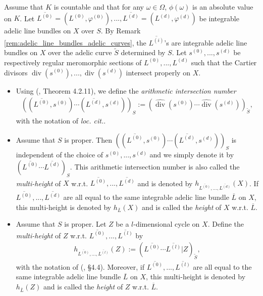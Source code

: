 \documentclass [11pt,reqno]{amsart}
\newcommand{\1}{\mathmybb{1}}
\def\div{\operatorname{div}}
\def\tilde{\widetilde}
\begin{document}
\begin{theorem-definition}
\label{th-def:arithmetic_intersection_product_tac_countable}
Assume that $K$ is countable and that for any $\omega\in\Omega$, $\phi(\omega)$ is an absolute value on $K$. Let $\overline{L^{(0)}}=(L^{(0)},\varphi^{(0)}),...,\overline{L^{(d)}}=(L^{(d)},\varphi^{(d)})$ be integrable adelic line bundles on $X$ over $S$. By Remark \ref{rem:adelic_line_bundles_adelic_curves}, the $\overline{L^{(i)}}$'s are integrable adelic line bundles on $X$ over the adelic curve $\tilde{S}$ determined by $S$. Let $s^{(0)},...,s^{(d)}$ be respectively regular meromorphic sections of $L^{(0)},...,L^{(d)}$ such that the Cartier divisors $\div(s^{(0)}),...,\div(s^{(d)})$ intersect properly on $X$.
\begin{itemize}
	\item[(1)] Using (\cite{ChenMori21}, Theorem 4.2.11), we define the \emph{arithmetic intersection number}
\begin{align*}
\left((\overline{L^{(0)}},s^{(0)})\cdots(\overline{L^{(d)}},s^{(d)})\right)_{S} := (\widehat{\div}(s^{(0)})\cdots\widehat{\div}(s^{(d)}))_{\tilde{S}},
\end{align*}
with the notation of \emph{loc. cit.}.
	\item[(2)] Assume that $S$ is proper. Then $\left((\overline{L^{(0)}},s^{(0)})\cdots(\overline{L^{(d)}},s^{(d)})\right)_{S}$ is independent of the choice of $s^{(0)},...,s^{(d)}$ and we simply denote it by $\left(\overline{L^{(0)}}\cdots\overline{L^{(d)}}\right)_{S}$. This arithmetic intersection number is also called the \emph{multi-height} of $X$ w.r.t. $\overline{L^{(0)}},...,\overline{L^{(d)}}$ and is denoted by $h_{\overline{L^{(0)}},...,\overline{L^{(d)}}}(X)$. If $\overline{L^{(0)}},...,\overline{L^{(d)}}$ are all equal to the same integrable adelic line bundle $\overline{L}$ on $X$, this multi-height is denoted by $h_{\overline{L}}(X)$ and is called the \emph{height} of $X$ w.r.t. $\overline{L}$.
	\item[(3)] Assume that $S$ is proper. Let $Z$ be a $l$-dimensional cycle on $X$. Define the \emph{multi-height} of $Z$ w.r.t. $\overline{L^{(0)}},...,\overline{L^{(l)}}$ by 
	\begin{align*}
	h_{\overline{L^{(0)}},...,\overline{L^{(l)}}}(Z) := \left(\overline{L^{(0)}}\cdots\overline{L^{(l)}}|Z\right)_{\tilde{S}},
	\end{align*}
	with the notation of (\cite{ChenMori21}, \S 4.4). Moreover, if $\overline{L^{(0)}},...,\overline{L^{(l)}}$ are all equal to the same integrable adelic line bundle $\overline{L}$ on $X$, this multi-height is denoted by $h_{\overline{L}}(Z)$ and is called the \emph{height} of $Z$ w.r.t. $\overline{L}$.

\end{itemize}
\end{theorem-definition}
\end{document}

